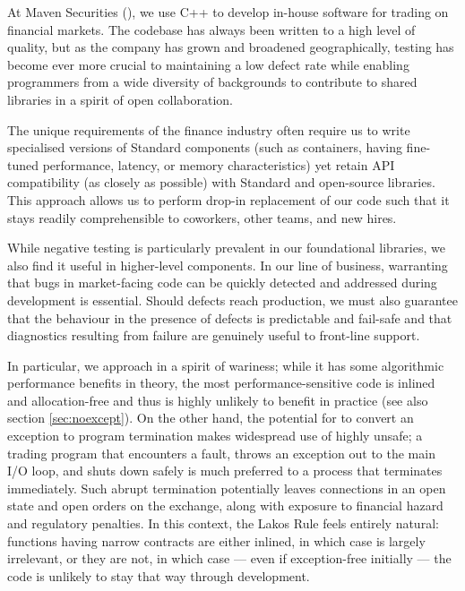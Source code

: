 At Maven Securities (\hyperref[https://www.mavensecurities.com/]{}), we use C++ to develop in-house software for trading on financial markets. The codebase has always been written to a high level of quality, but as the company has grown and broadened geographically, testing has become ever more crucial to maintaining a low defect rate while enabling programmers from a wide diversity of backgrounds to contribute to shared libraries in a spirit of open collaboration.

The unique requirements of the finance industry often require us to write specialised versions of Standard components (such as containers, having fine-tuned performance, latency, or memory characteristics) yet retain API compatibility (as closely as possible) with Standard and open-source libraries. This approach allows us to perform drop-in replacement of our code such that it stays readily comprehensible to coworkers, other teams, and new hires.

While negative testing is particularly prevalent in our foundational libraries, we also find it useful in higher-level components. In our line of business, warranting that bugs in market-facing code can be quickly detected and addressed during development is essential. Should defects reach production, we must also guarantee that the behaviour in the presence of defects is predictable and fail-safe and that diagnostics resulting from failure are genuinely useful to front-line support.

In particular, we approach  in a spirit of wariness; while it has some algorithmic performance benefits in theory, the most performance-sensitive code is inlined and allocation-free and thus is highly unlikely to benefit in practice (see also section \ref{sec:noexcept}). On the other hand, the potential for  to convert an exception to program termination makes widespread use of  highly unsafe; a trading program that encounters a fault, throws an exception out to the main I/O loop, and shuts down safely is much preferred to a process that terminates immediately.  Such abrupt termination potentially leaves connections in an open state and open orders on the exchange, along with exposure to financial hazard and regulatory penalties. In this context, the Lakos Rule feels entirely natural: functions having narrow contracts are either inlined, in which case 
is largely irrelevant, or they are not, in which case --- even if exception-free initially --- the code is unlikely to stay that way through development.

